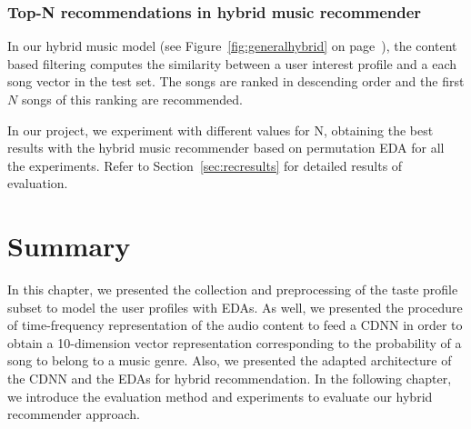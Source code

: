 \subsubsection{Top-N recommendations in hybrid music recommender}
In our hybrid music model (see Figure~\ref{fig:generalhybrid} on page~\pageref{fig:generalhybrid}), the content based filtering computes the similarity between a user interest profile and a each song vector in the test set. The songs are ranked in descending order and the first $N$ songs of this ranking are recommended.

In our project, we experiment with different values for N, obtaining the best results with the hybrid music recommender based on permutation EDA for all the experiments. Refer to Section~\ref{sec:recresults} for detailed results of evaluation.

\section{Summary}
In this chapter, we presented the collection and preprocessing of the taste profile subset to model the user profiles with EDAs. As well, we presented the procedure of time-frequency representation of the audio content to feed a CDNN in order to obtain a 10-dimension vector representation corresponding to the probability of a song to belong to a music genre. Also, we presented the adapted architecture of the CDNN and the EDAs for hybrid recommendation. In the following chapter, we introduce the evaluation method and experiments to evaluate our hybrid recommender approach.